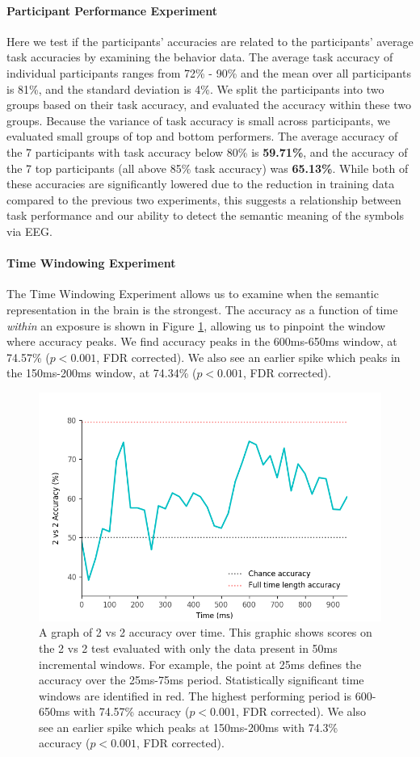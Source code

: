 \paragraph{Participant Performance Experiment} Here we test if the participants' \tvt accuracies are related to the participants' average task accuracies by examining the behavior data. The average task accuracy of individual participants ranges from 72\% - 90\% and the mean over all participants is 81\%, and the standard deviation is 4\%. We split the participants into two groups based on their task accuracy, and evaluated the \tvt accuracy within these two groups. Because the variance of task accuracy is small across participants, we evaluated small groups of top and bottom performers. The average \tvt accuracy of the 7 participants with task accuracy below 80\% is {\bf 59.71\%}, and the \tvt accuracy of the 7 top participants (all above 85\% task accuracy) was {\bf 65.13\%}. While both of these \tvt accuracies are significantly lowered due to the reduction in training data compared to the previous two experiments, this suggests a relationship between task performance and our ability to detect the semantic meaning of the symbols via EEG.

\paragraph{Time Windowing Experiment} The Time Windowing Experiment allows us to examine when the semantic representation in the brain is the strongest. The \tvt accuracy as a function of time \emph{within} an exposure is shown in Figure \ref{fig:timewindow}, allowing us to pinpoint the window where accuracy peaks. We find accuracy peaks in the 600ms-650ms window, at 74.57\% ($p < 0.001$, FDR corrected). We also see an earlier spike which peaks in the 150ms-200ms window, at 74.34\% ($p < 0.001$, FDR corrected).

\begin{figure}[t]
  \centering
  \includegraphics[width=0.75\linewidth]{figures/timewindow}
  \caption{A graph of 2 vs 2 accuracy over time. This graphic shows scores on the 2 vs 2 test evaluated with only the data present in 50ms incremental windows. For example, the point at 25ms defines the \tvt accuracy over the 25ms-75ms period. Statistically significant time windows are identified in red. The highest performing period is 600-650ms with 74.57\% accuracy ($p < 0.001$, FDR corrected). We also see an earlier spike which peaks at 150ms-200ms with 74.3\% accuracy ($p < 0.001$, FDR corrected).}
  \label{fig:timewindow}
\end{figure}

